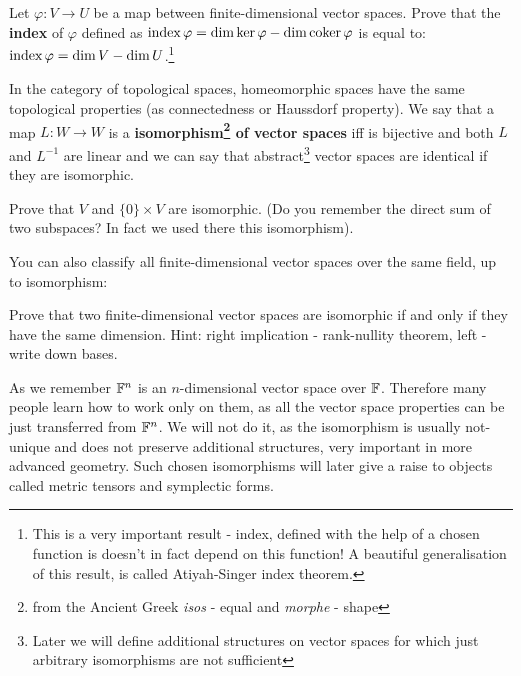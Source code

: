 \begin{prob}
  Let $\varphi : V\to U$ be a map between finite-dimensional vector spaces. Prove that the \textbf{index} of $\varphi$ defined as $\text{index\,} \varphi=\dim \text{ker\,} \varphi - \dim \text{coker\,} \varphi$ is equal to:
   $\text{index\,} \varphi=\dim V - \dim U$.\footnote{This is a very important result - index, defined with the help of a chosen function is doesn't in fact depend on this function! A beautiful generalisation of this result, is called Atiyah-Singer index theorem.}
\end{prob}

In the category of topological spaces, homeomorphic spaces have the same topological properties (as connectedness or Haussdorf property). We say that a map $L:W\to W$ is a
\textbf{isomorphism\footnote{from the Ancient Greek \textit{isos} - equal and \textit{morphe} - shape} of vector spaces} iff is bijective and both $L$ and $L^{-1}$ are linear and
we can say that abstract\footnote{Later we will define additional structures on vector spaces for which just arbitrary isomorphisms are not sufficient} vector spaces are identical if they are isomorphic.

\begin{prob}
  Prove that $V$ and $\{0\}\times V$ are isomorphic. (Do you remember the direct sum of two subspaces? In fact we used there this isomorphism).
\end{prob}

You can also classify all finite-dimensional vector spaces over the same field, up to isomorphism:

\begin{prob}
  Prove that two finite-dimensional vector spaces are isomorphic if and only if they have the same dimension. Hint: right implication - rank-nullity theorem, left - write down bases.
\end{prob}

As we remember $\mathbb F^n$ is an $n$-dimensional vector space over $\mathbb F$. Therefore many people learn how to work only on them, as all the vector space properties can be
just transferred from $\mathbb F^n$. We will not do it, as the isomorphism is usually not-unique and does not preserve additional structures, very important in more advanced geometry.
Such chosen isomorphisms will later give a raise to objects called metric tensors and symplectic forms.

